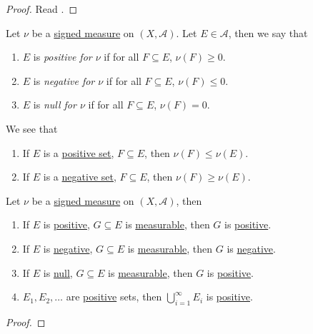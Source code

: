 \begin{proof}
	Read \cite{folland1999real}.
\end{proof}

\begin{definition}
	Let \(\nu\) be a \hyperref[def:signed-measure]{signed measure} on \((X, \mathcal{A})\). Let \(E \in \mathcal{A}\), then we say that
	\begin{enumerate}
		\item\label{def:positive-set-for-a-signed-measure} \(E\) is \emph{positive for \(\nu\)} if for all \(F \subseteq E\), \(\nu(F) \geq 0\).
		\item\label{def:negative-set-for-a-signed-measure} \(E\) is \emph{negative for \(\nu\)} if for all \(F \subseteq E\), \(\nu(F) \leq 0\).
		\item\label{def:null-set-for-a-signed-measure} \(E\) is \emph{null for \(\nu\)} if for all \(F \subseteq E\), \(\nu(F) = 0\).
	\end{enumerate}
\end{definition}

\begin{note}
	We see that
	\begin{enumerate}
		\item If \(E\) is a \hyperref[def:positive-set-for-a-signed-measure]{positive set}, \(F \subseteq E\), then \(\nu(F) \leq \nu(E)\).
		\item If \(E\) is a \hyperref[def:negative-set-for-a-signed-measure]{negative set}, \(F \subseteq E\), then \(\nu(F) \geq \nu(E)\).
	\end{enumerate}
\end{note}

\begin{lemma}\label{lma:lec28-1}
	Let \(\nu\) be a \hyperref[def:signed-measure]{signed measure} on \((X, \mathcal{A})\), then
	\begin{enumerate}
		\item If \(E\) is \hyperref[def:positive-set-for-a-signed-measure]{positive}, \(G \subseteq E\) is \hyperref[def:measurable-set]{measurable},
		      then \(G\) is \hyperref[def:positive-set-for-a-signed-measure]{positive}.
		\item If \(E\) is \hyperref[def:negative-set-for-a-signed-measure]{negative}, \(G \subseteq E\) is \hyperref[def:measurable-set]{measurable},
		      then \(G\) is \hyperref[def:negative-set-for-a-signed-measure]{negative}.
		\item If \(E\) is \hyperref[def:null-set-for-a-signed-measure]{null}, \(G \subseteq E\) is \hyperref[def:measurable-set]{measurable},
		      then \(G\) is \hyperref[def:positive-set-for-a-signed-measure]{positive}.
		\item \(E_1,E_2,\ldots\) are \hyperref[def:positive-set-for-a-signed-measure]{positive} sets,
		      then \(\bigcup_{i=1}^\infty E_i\) is \hyperref[def:positive-set-for-a-signed-measure]{positive}.
	\end{enumerate}
\end{lemma}
\begin{proof}
\end{proof}

